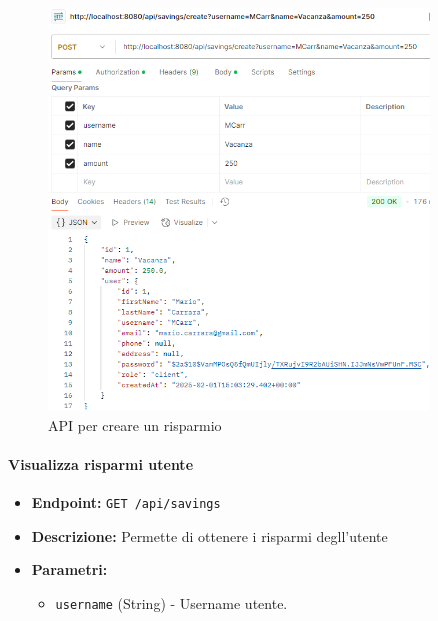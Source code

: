 \begin{figure}[H]
    \centering
    \includegraphics[width=0.9\textwidth]{images/CreateSavingAPI.png}
    \caption{API per creare un risparmio}
    \label{fig: CreateSavingAPI}
\end{figure}

\paragraph{Visualizza risparmi utente} 

\begin{itemize}
    \item \textbf{Endpoint:} \texttt{GET /api/savings}
    \item \textbf{Descrizione:} Permette di ottenere i risparmi degll'utente
    \item \textbf{Parametri:}
    \begin{itemize}
        \item \texttt{username} (String) - Username utente.
    \end{itemize}
\end{itemize}

